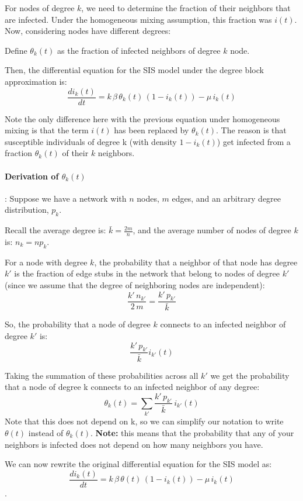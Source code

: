 \documentclass[11pt]{scrartcl} %
\begin{document}
For nodes of degree $k$, we need to determine the fraction of their neighbors that are infected. Under the homogeneous mixing assumption, this fraction was $i(t)$. Now, considering nodes have different degrees:

Define $\theta_k(t)$ as the fraction of infected neighbors of degree $k$ node. 

Then, the differential equation for the SIS model under the degree block approximation is:
\[\frac{di_k(t)}{dt} = k \, \beta \, \theta_k(t)\, (1-i_k(t)) - \mu\, i_k(t)\]

Note the only difference here with the previous equation under homogeneous mixing is that the term $i(t)$ has been replaced by $\theta_k(t)$. The reason is that susceptible individuals of degree k (with density $1-i_k(t)$) get infected from a fraction $\theta_k(t)$ of their $k$ neighbors.

\paragraph{Derivation of $\theta_k(t)$}: Suppose we have a network with $n$ nodes, $m$ edges, and an arbitrary degree distribution, $p_k$.

Recall the average degree is: $\bar{k} = \frac{2m}{n}$, and the average number of nodes of degree $k$ is: $n_k = n p_k$.

For a node with degree $k$, the probability that a neighbor of that node has degree $k'$ is the fraction of edge stubs in the network that belong to nodes of degree $k'$ (since we assume that the degree of neighboring nodes are independent):
\[ \frac{k' \, n_{k'}}{2 \, m} = \frac{k' \, p_{k'}}{\bar{k}} \]

So, the probability that a node of degree $k$ connects to an infected neighbor of degree $k'$ is:
\[ \frac{k' \, p_{k'}}{\bar{k}} i_{k'}(t) \] 

Taking the summation of these probabilities across all $k'$ we get the probability that a node of degree k connects to an infected neighbor of any degree:
\[ \theta_k(t) = \sum_{k'} \frac{k' \, p_{k'}}{\bar{k}} \, i_{k'}(t) \]
Note that this does not depend on k, so we can simplify our notation to write $\theta(t)$ instead of $\theta_k(t)$. \textbf{Note:} this means that the probability that any of your neighbors is infected does not depend on how many neighbors you have.

We can now rewrite the original differential equation for the SIS model as:
\[ \frac{di_k(t)}{dt} = k \, \beta \, \theta(t) \, (1-i_k(t)) - \mu \, i_k(t) \].
\end{document}
